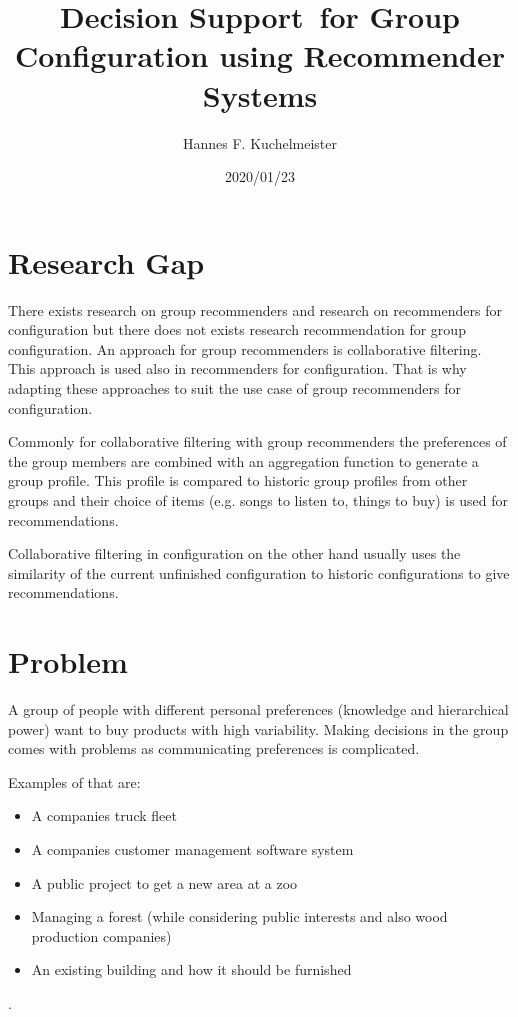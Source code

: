 \documentclass{article}
\begin{document}
\title{Decision Support for Group Configuration using Recommender Systems}
\author{Hannes F. Kuchelmeister}
\date{2020/01/23}

\maketitle

\section{Research Gap}

There exists research on group recommenders and research on recommenders for configuration but there does not exists research recommendation for group configuration. An approach for group recommenders is collaborative filtering. This approach is used also in recommenders for configuration. That is why adapting these approaches to suit the use case of group recommenders for configuration.

Commonly for collaborative filtering with group recommenders the preferences of the group members are combined with an aggregation function to generate a group profile. This profile is compared to historic group profiles from other groups and their choice of items (e.g. songs to listen to, things to buy) is used for recommendations.

Collaborative filtering in configuration on the other hand usually uses the similarity of the current unfinished configuration to historic configurations to give recommendations.

\section{Problem}
A group of people with different personal preferences (knowledge and hierarchical power) want to buy products with high variability. Making decisions in the group comes with problems as communicating preferences is complicated.

Examples of that are:
\begin{itemize}
    \item A companies truck fleet
    \item A companies customer management software system
    \item A public project to get a new area at a zoo
    \item Managing a forest (while considering public interests and also wood production companies)
    \item An existing building and how it should be furnished
\end{itemize}. 
\end{document}
